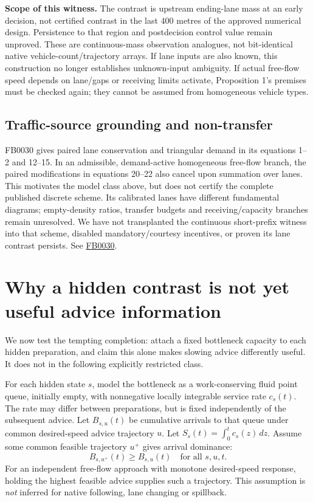 \documentclass[11pt]{article}
\begin{document}
\textbf{Scope of this witness.} The contrast is upstream ending-lane mass at an
early decision, not certified contrast in the last 400 metres of the approved
numerical design. Persistence to that region and postdecision control value
remain unproved. These are continuous-mass observation analogues, not bit-identical
native vehicle-count/trajectory arrays. If lane inputs are also known, this
construction no longer establishes unknown-input ambiguity. If actual free-flow
speed depends on lane/gaps or receiving limits activate, Proposition 1's
premises must be checked again; they cannot be assumed from homogeneous vehicle types.

\subsection*{Traffic-source grounding and non-transfer}
FB0030 gives paired lane conservation and triangular demand in its equations
1--2 and 12--15. In an admissible, demand-active homogeneous free-flow branch,
the paired modifications in equations 20--22 also cancel upon summation over
lanes. This motivates the model class above, but does not certify the complete
published discrete scheme. Its calibrated lanes have different fundamental
diagrams; empty-density ratios, transfer budgets and receiving/capacity branches
remain unresolved. We have not transplanted the continuous short-prefix witness
into that scheme, disabled mandatory/courtesy incentives, or proven its lane
contrast persists. See \href{https://doi.org/10.1080/21680566.2019.1700846}{FB0030}.

\section{Why a hidden contrast is not yet useful advice information}
We now test the tempting completion: attach a fixed bottleneck capacity to each
hidden preparation, and claim this alone makes slowing advice differently useful.
It does not in the following explicitly restricted class.

For each hidden state $s$, model the bottleneck as a work-conserving fluid point
queue, initially empty, with nonnegative locally integrable service rate $c_s(t)$.
The rate may differ between preparations, but is fixed independently of the
subsequent advice. Let $B_{s,u}(t)$ be cumulative arrivals to that queue under
common desired-speed advice trajectory $u$. Let $S_s(t)=\int_0^t c_s(z)\,dz$.
Assume some common feasible trajectory $u^+$ gives arrival dominance:
\begin{equation}
B_{s,u^+}(t)\geq B_{s,u}(t)\quad\text{for all }s,u,t.
\label{eq:arrivals}
\end{equation}
For an independent free-flow approach with monotone desired-speed response,
holding the highest feasible advice supplies such a trajectory. This assumption
is \emph{not} inferred for native following, lane changing or spillback.
\end{document}
